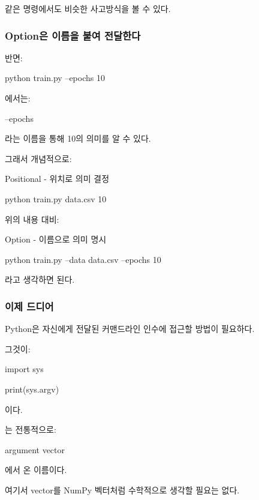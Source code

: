 같은 명령에서도 비슷한 사고방식을 볼 수 있다.

\subsubsection{Option은 이름을 붙여 전달한다}

반면:

\begin{dhkzsh}
python train.py --epochs 10
\end{dhkzsh}

에서는:

\begin{dhkzsh}
--epochs
\end{dhkzsh}

라는 이름을 통해 10의 의미를 알 수 있다.

그래서 개념적으로:

\begin{dhksmry}[centered]
Positional - 위치로 의미 결정

python train.py data.csv 10
\end{dhksmry}

위의 내용 대비:

\begin{dhksmry}[centered]
Option - 이름으로 의미 명시

python train.py --data data.csv --epochs 10
\end{dhksmry}

라고 생각하면 된다.

\subsubsection{이제 드디어 }

Python은 자신에게 전달된 커맨드라인 인수에 접근할 방법이 필요하다.

그것이:

\begin{dhkcode}
import sys

print(sys.argv)
\end{dhkcode}

이다.

는 전통적으로:

\begin{dhksmry}[centered]
argument vector
\end{dhksmry}

에서 온 이름이다.

여기서 vector를 NumPy 벡터처럼 수학적으로 생각할 필요는 없다.

